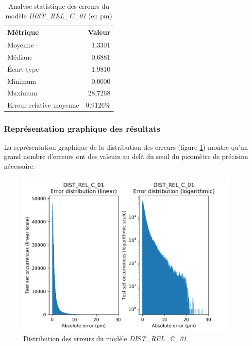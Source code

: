 \begin{table}
	\centering
	\begin{tabular}{|l|r|}
		\hline
		\textbf{Métrique} & \textbf{Valeur} \\ \hline
		Moyenne & 1,3301 \\ \hline
		Médiane & 0,6881 \\ \hline
		Écart-type & 1,9810 \\ \hline
		Minimum & 0,0000 \\ \hline
		Maximum & 28,7268\\ \hline
		Erreur relative moyenne & 0,9126\% \\ \hline
	\end{tabular}
	
	\caption{Analyse statistique des erreurs du modèle \emph{DIST\_REL\_C\_01} (en pm)}
	\label{table_analyse_dist_rel_c_01}
\end{table}

\subsubsection{Représentation graphique des résultats}
\par La représentation graphique de la distribution des erreurs (figure \ref{fdistrib_err_dist_rel_c_01}) montre qu'un grand nombre d'erreurs ont des valeurs au delà du seuil du picomètre de précision nécessaire.

\begin{figure}
	\centering
	\includegraphics[scale=0.7]{../figures/DIST_REL_C_01/DIST_REL_C_01_distrib_rmse_val.png}	
	\caption{Distribution des erreurs du modèle \emph{DIST\_REL\_C\_01}}
	\label{fdistrib_err_dist_rel_c_01}
\end{figure}

